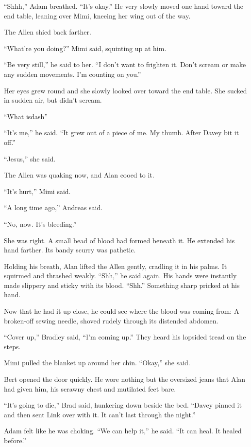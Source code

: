 ``Shhh,'' Adam breathed.  ``It's okay.'' He very slowly moved one hand
toward the end table, leaning over Mimi, kneeing her wing out of the
way. 

The Allen shied back farther. 

``What're you doing?'' Mimi said, squinting up at him.

``Be very still,'' he said to her.  ``I don't want to frighten it. 
Don't scream or make any sudden movements.  I'm counting on you.''

Her eyes grew round and she slowly looked over toward the end table. 
She sucked in sudden air, but didn't scream.

``What isdash{}''

``It's me,'' he said.  ``It grew out of a piece of me.  My thumb. 
After Davey bit it off.''

``Jesus,'' she said.

The Allen was quaking now, and Alan cooed to it. 

``It's hurt,'' Mimi said.

``A long time ago,'' Andreas said.

``No, now.  It's bleeding.''

She was right.  A small bead of blood had formed beneath it.  He
extended his hand farther.  Its bandy scurry was pathetic.

Holding his breath, Alan lifted the Allen gently, cradling it in his
palms.  It squirmed and thrashed weakly.  ``Shh,'' he said again.  His
hands were instantly made slippery and sticky with its blood. 
``Shh.'' Something sharp pricked at his hand.

Now that he had it up close, he could see where the blood was coming
from:  A broken-off sewing needle, shoved rudely through its distended
abdomen.

``Cover up,'' Bradley said, ``I'm coming up.'' They heard his lopsided
tread on the steps.

Mimi pulled the blanket up around her chin.  ``Okay,'' she said.

Bert opened the door quickly.  He wore nothing but the oversized jeans
that Alan had given him, his scrawny chest and mutilated feet bare.

``It's going to die,'' Brad said, hunkering down beside the bed. 
``Davey pinned it and then sent Link over with it.  It can't last
through the night.''

Adam felt like he was choking.  ``We can help it,'' he said.  ``It can
heal.  It healed before.''

